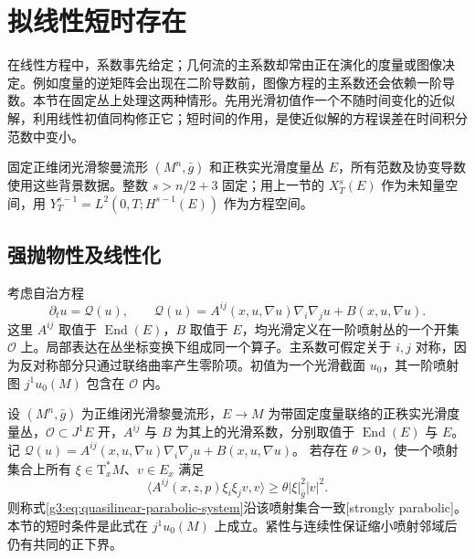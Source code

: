 
% 
% 

\section{拟线性短时存在}
\label{g3:sec:2602}

在线性方程中，系数事先给定；几何流的主系数却常由正在演化的度量或图像决定。例如度量的逆矩阵会出现在二阶导数前，图像方程的主系数还会依赖一阶导数。本节在固定丛上处理这两种情形。先用光滑初值作一个不随时间变化的近似解，利用线性初值同构修正它；短时间的作用，是使近似解的方程误差在时间积分范数中变小。

\ProseParagraphBreak
固定正维闭光滑黎曼流形 \((M^n,\bar g)\) 和正秩实光滑度量丛 \(E\)，所有范数及协变导数使用这些背景数据。整数 \(s>n/2+3\) 固定；用上一节的 \(X_T^s(E)\) 作为未知量空间，用 \(Y_T^{s-1}=L^2(0,T;H^{s-1}(E))\) 作为方程空间。

\subsection{强抛物性及线性化}
\label{g3:subsec:2602:01}
考虑自治方程
\begin{equation}\label{g3:eq:quasilinear-parabolic-system}
	\partial_tu=\mathcal Q(u),\qquad
	\mathcal Q(u)=A^{ij}(x,u,\nabla u)\nabla_i\nabla_j u+B(x,u,\nabla u).
\end{equation}
这里 \(A^{ij}\) 取值于 \(\operatorname{End}(E)\)，\(B\) 取值于 \(E\)，均光滑定义在一阶喷射丛的一个开集 \(\mathcal O\) 上。局部表达在丛坐标变换下组成同一个算子。主系数可假定关于 \(i,j\) 对称，因为反对称部分只通过联络曲率产生零阶项。初值为一个光滑截面 \(u_0\)，其一阶喷射图 \(j^1u_0(M)\) 包含在 \(\mathcal O\) 内。

\begin{definition}\label{g3:def:quasilinear-strong-parabolicity}
	设 \((M^n,\bar g)\) 为正维闭光滑黎曼流形，\(E\to M\) 为带固定度量联络的正秩实光滑度量丛，\(\mathcal O\subset J^1E\) 开，\(A^{ij}\) 与 \(B\) 为其上的光滑系数，分别取值于 \(\operatorname{End}(E)\) 与 \(E\)。记 \(\mathcal Q(u)=A^{ij}(x,u,\nabla u)\nabla_i\nabla_ju+B(x,u,\nabla u)\)。
	若存在 \(\theta>0\)，使一个喷射集合上所有 \(\xi\in\mathrm T_x^*M\)、\(v\in E_x\) 满足
	\[
		\langle A^{ij}(x,z,p)\xi_i\xi_jv,v\rangle
		\ge\theta|\xi|_{\bar g}^2|v|^2.
	\]
	则称式\eqref{g3:eq:quasilinear-parabolic-system}沿该喷射集合一致[strongly parabolic]。本节的短时条件是此式在 \(j^1u_0(M)\) 上成立。紧性与连续性保证缩小喷射邻域后仍有共同的正下界。
\end{definition}

